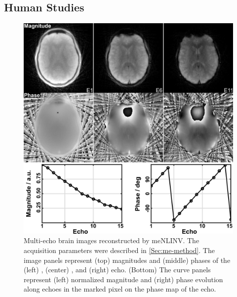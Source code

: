 \subsection{Human Studies}

\begin{figure}[p]
  \centering
  \includegraphics[width=\textwidth]{fig/multi-echo-brain-menlinv.png}
  \caption{Multi-echo brain images reconstructed by meNLINV. The acquisition parameters were described in \cref{Sec:me-method}. The image panels represent (top) magnitudes and (middle) phases of the (left) , (center) , and (right)  echo. (Bottom) The curve panels represent (left) normalized magnitude and (right) phase evolution along echoes in the marked pixel on the phase map of the  echo.} \label{Fig:multi-echo-brain-menlinv}
\end{figure}
